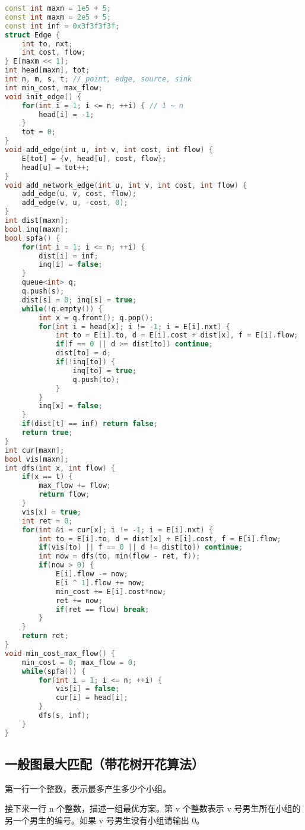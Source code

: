 \begin{lstlisting}[language=C++]
const int maxn = 1e5 + 5;
const int maxm = 2e5 + 5;
const int inf = 0x3f3f3f3f;
struct Edge {
    int to, nxt;
    int cost, flow;
} E[maxm << 1];
int head[maxn], tot;
int n, m, s, t; // point, edge, source, sink
int min_cost, max_flow;
void init_edge() {
    for(int i = 1; i <= n; ++i) { // 1 ~ n
        head[i] = -1;
    }
    tot = 0;
}
void add_edge(int u, int v, int cost, int flow) {
    E[tot] = {v, head[u], cost, flow};
    head[u] = tot++;
}
void add_network_edge(int u, int v, int cost, int flow) {
    add_edge(u, v, cost, flow);
    add_edge(v, u, -cost, 0);
}
int dist[maxn];
bool inq[maxn];
bool spfa() {
    for(int i = 1; i <= n; ++i) {
        dist[i] = inf;
        inq[i] = false;
    }
    queue<int> q;
    q.push(s);
    dist[s] = 0; inq[s] = true;
    while(!q.empty()) {
        int x = q.front(); q.pop();
        for(int i = head[x]; i != -1; i = E[i].nxt) {
            int to = E[i].to, d = E[i].cost + dist[x], f = E[i].flow;
            if(f == 0 || d >= dist[to]) continue;
            dist[to] = d;
            if(!inq[to]) {
                inq[to] = true;
                q.push(to);
            }
        }
        inq[x] = false;
    }
    if(dist[t] == inf) return false;
    return true;
}
int cur[maxn];
bool vis[maxn];
int dfs(int x, int flow) {
    if(x == t) {
        max_flow += flow;
        return flow;
    }
    vis[x] = true;
    int ret = 0;
    for(int &i = cur[x]; i != -1; i = E[i].nxt) {
        int to = E[i].to, d = dist[x] + E[i].cost, f = E[i].flow;
        if(vis[to] || f == 0 || d != dist[to]) continue;
        int now = dfs(to, min(flow - ret, f));
        if(now > 0) {
            E[i].flow -= now;
            E[i ^ 1].flow += now;
            min_cost += E[i].cost*now;
            ret += now;
            if(ret == flow) break;
        }
    }
    return ret;
}
void min_cost_max_flow() {
    min_cost = 0; max_flow = 0;
    while(spfa()) {
        for(int i = 1; i <= n; ++i) {
            vis[i] = false;
            cur[i] = head[i];
        }
        dfs(s, inf);
    }
}
\end{lstlisting}

\subsection{一般图最大匹配（带花树开花算法）}

第一行一个整数，表示最多产生多少个小组。

接下来一行 n 个整数，描述一组最优方案。第 v 个整数表示 v 号男生所在小组的另一个男生的编号。如果 v 号男生没有小组请输出 0。

